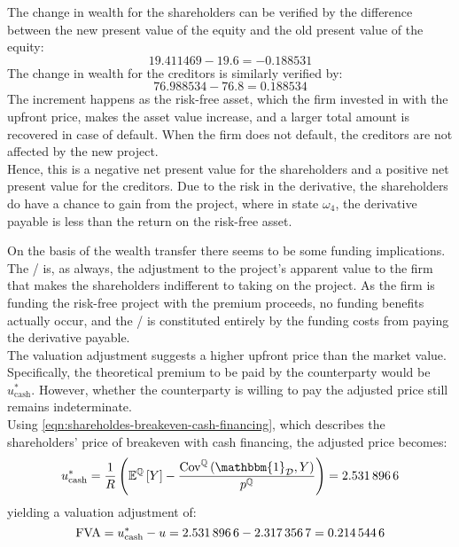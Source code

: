 \documentclass[../main.tex]{subfiles}
\begin{document}
            The change in wealth for the shareholders can be verified by the difference between the new present value of the equity and the old present value of the equity:
            \begin{equation*}
                \num{19.411469} - \num{19.6} = \num{-0.188531}
            \end{equation*}
            The change in wealth for the creditors is similarly verified by:
            \begin{equation*}
                \num{76.988534} - \num{76.8} = \num{0.188534}
            \end{equation*}
            The increment happens as the risk-free asset, which the firm invested in with the upfront price, 
            makes the asset value increase, and a larger total amount is recovered in case of default. 
            When the firm does not default, the creditors are not affected by the new project.
            \\
            Hence, this is a negative net present value for the shareholders 
            and a positive net present value for the creditors. 
            Due to the risk in the derivative, the shareholders do have a chance to gain from the project, 
            where in state $\omega_4$, the derivative payable is less than the return on the risk-free asset.

            On the basis of the wealth transfer there seems to be some funding implications.
            The \FVA/ is, as always, the adjustment to the project's apparent value to the firm that makes the shareholders indifferent to taking on the project.
            As the firm is funding the risk-free project with the premium proceeds, no funding benefits actually occur, and the \FVA/ is constituted entirely by the funding costs from paying the derivative payable.
            \\
            The valuation adjustment suggests a higher upfront price than the market value.
            Specifically, the theoretical premium to be paid by the counterparty would be $u_{\text{cash}}^{\ast}$.
            However, whether the counterparty is willing to pay the adjusted price still remains indeterminate.
            \\
            Using \cref{eqn:shareholdes-breakeven-cash-financing}, which describes the shareholders' price of breakeven with cash financing, the adjusted price becomes:
            \begin{equation*}
                u_{\text{cash}}^{\ast} = \discountfactor \left(
                    \mathbb{E}^{\rnmeasure}\left[Y\right] -
                    \frac{\text{Cov}^{\rnmeasure}\left(\mathbbm{1}_{\mathcal{D}},Y\right)}
                    {p^{\rnmeasure}}
                \right)
                = \num{2.5318966}
            \end{equation*}
            yielding a valuation adjustment of:
            \begin{equation*}
                \FVA/ = u_{\text{cash}}^{\ast} - u = \num{2.5318966} - \num{2.3173567} = \num{0.2145446}
            \end{equation*}
\end{document}
